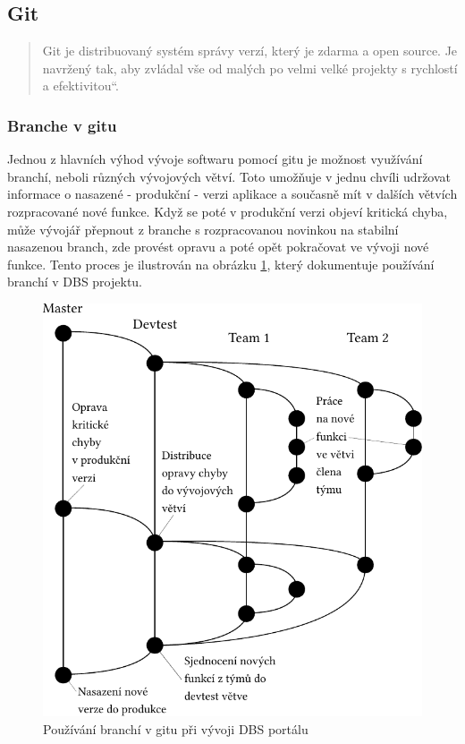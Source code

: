 \subsection{Git} \label{version:git}

\begin{quote}
\quotedblbase Git je distribuovaný systém správy verzí, který je zdarma a open source. Je navržený tak, aby zvládal vše od malých po velmi velké projekty s rychlostí a efektivitou\textquotedblleft \cite{git}.
\end{quote}

\subsubsection{Branche v gitu} \label{version:git:branching}
Jednou z hlavních výhod vývoje softwaru pomocí gitu je možnost využívání branchí, neboli různých vývojových větví. Toto umožňuje v jednu chvíli udržovat informace o nasazené - produkční - verzi aplikace a současně mít v dalších větvích rozpracované nové funkce. Když se poté v produkční verzi objeví kritická chyba, může vývojář přepnout z branche s rozpracovanou novinkou na stabilní nasazenou branch, zde provést opravu a poté opět pokračovat ve vývoji nové funkce. Tento proces je ilustrován na obrázku \ref{picture:git_branching}, který dokumentuje používání branchí v DBS projektu.\\
\begin{figure}[h]
\includegraphics[width=\textwidth]{../pdf/git_branching.pdf}
\caption{Používání branchí v gitu při vývoji DBS portálu} \label{picture:git_branching}
\end{figure}

